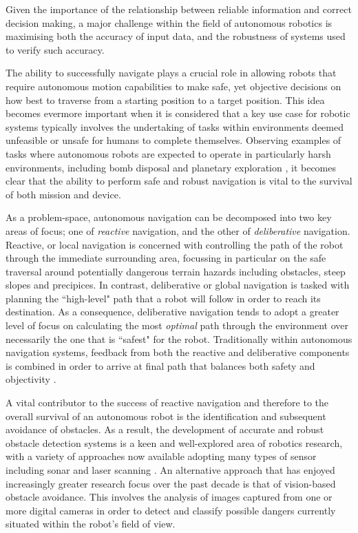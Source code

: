 Given the importance of the relationship between reliable information and correct decision making, a major challenge within the field of autonomous robotics is maximising both the accuracy of input data, and the robustness of systems used to verify such accuracy.

  The ability to successfully navigate plays a crucial role in allowing robots that require autonomous motion capabilities to make safe, yet objective decisions on how best to traverse from a starting position to a target position. This idea becomes evermore important when it is considered that a key use case for robotic systems typically involves the undertaking of tasks within environments deemed unfeasible or unsafe for humans to complete themselves. Observing examples of tasks where autonomous robots are expected to operate in particularly harsh environments, including bomb disposal \cite{bomb-disposal} and planetary exploration \cite{planet-explore}, it becomes clear that the ability to perform safe and robust navigation is vital to the survival of both mission and device.

As a problem-space, autonomous navigation can be decomposed into two key areas of focus; one of \textit{reactive} navigation, and the other of \textit{deliberative} navigation. Reactive, or local navigation is concerned with controlling the path of the robot through the immediate surrounding area, focussing in particular on the safe traversal around potentially dangerous terrain hazards including obstacles, steep slopes and precipices. In contrast, deliberative or global navigation is tasked with planning the ``high-level" path that a robot will follow in order to reach its destination. As a consequence, deliberative navigation tends to adopt a greater level of focus on calculating the most \textit{optimal} path through the environment over necessarily the one that is ``safest" for the robot. Traditionally within autonomous navigation systems, feedback from both the reactive and deliberative components is combined in order to arrive at final path that balances both safety and objectivity \cite{mer-rover}. 

A vital contributor to the success of reactive navigation and therefore to the overall survival of an autonomous robot is the identification and subsequent avoidance of obstacles. As a result, the development of accurate and robust obstacle detection systems is a keen and well-explored area of robotics research, with a variety of approaches now available adopting many types of sensor including sonar \cite{sonar-sensor} and laser scanning \cite{laser-sensor}. An alternative approach that has enjoyed increasingly greater research focus over the past decade is that of vision-based obstacle avoidance. This involves the analysis of images captured from one or more digital cameras in order to detect and classify possible dangers currently situated within the robot's field of view. 

